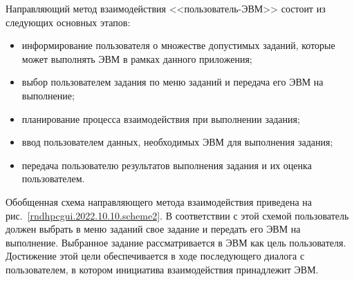 	
Направляющий метод взаимодействия <<пользователь-ЭВМ>> состоит из следующих основных этапов:
\begin{itemize}
	\item информирование пользователя о множестве допустимых заданий, которые может выполнять ЭВМ в рамках данного приложения;
	\item выбор пользователем задания по меню заданий и передача его ЭВМ на выполнение;
	\item планирование процесса взаимодействия при выполнении задания;
	\item ввод пользователем данных, необходимых ЭВМ для выполнения задания;
	\item передача пользователю результатов выполнения задания и их оценка пользователем. 
\end{itemize}

Обобщенная схема направляющего метода взаимодействия приведена на рис.~\ref{rndhpcgui.2022.10.10.scheme2}. В соответствии с этой схемой пользователь должен выбрать в меню заданий свое задание и передать его ЭВМ на выполнение. Выбранное задание рассматривается в ЭВМ как цель пользователя. Достижение этой цели обеспечивается в ходе последующего диалога с пользователем, в котором инициатива взаимодействия принадлежит ЭВМ.

